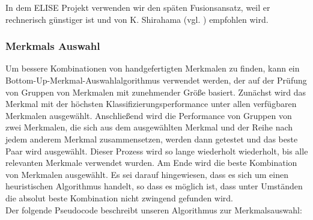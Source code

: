 In dem ELISE Projekt verwenden wir den späten Fusionsansatz, weil er rechnerisch günstiger ist und von K. Shirahama (vgl. \cite{kimiaki_codebook_approach_2016}) empfohlen wird. \\



\subsubsection{Merkmals Auswahl} \label{featureSelection-1}

Um bessere Kombinationen von handgefertigten Merkmalen zu finden, kann ein Bottom-Up-Merkmal-Auswahlalgorithmus verwendet werden, der auf der Prüfung von Gruppen von Merkmalen mit zunehmender Größe basiert.
Zunächst wird das Merkmal mit der höchsten Klassifizierungsperformance unter allen verfügbaren Merkmalen ausgewählt. 
Anschließend wird die Performance von Gruppen von zwei Merkmalen, die sich aus dem ausgewählten Merkmal und der Reihe nach jedem anderem Merkmal zusammensetzen, werden dann getestet und das beste Paar wird ausgewählt. 
Dieser Prozess wird so lange wiederholt wiederholt, bis alle relevanten Merkmale verwendet wurden. 
Am Ende wird die beste Kombination von Merkmalen ausgewählt.
Es sei darauf hingewiesen, dass es sich um einen heuristischen Algorithmus handelt, so dass es möglich ist, dass unter Umständen die absolut beste Kombination nicht zwingend gefunden wird. \\

Der folgende Pseudocode beschreibt unseren Algorithmus zur Merkmalsauswahl: \\

